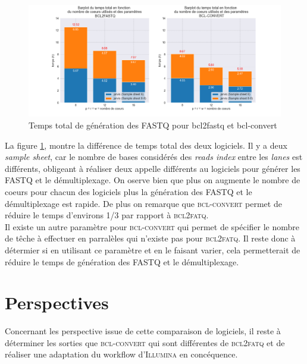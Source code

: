 \begin{figure}[H]
    \centering
    \includegraphics[width=1\textwidth]{img/barplot_total_time_comp.png}
    \caption{Temps total de génération des FASTQ pour bcl2fastq et bcl-convert}
    \label{fig-total-time}
\end{figure} 

La figure \ref{fig-total-time}, montre la différence de temps total des deux logiciels. Il y a deux \emph{sample sheet}, car le nombre de bases considérés des \emph{reads index} entre les \emph{lanes} est différents, obligeant à réaliser deux appelle différents au logiciels pour générer les \textsc{FASTQ} et le démultiplexage. 
On oserve bien que plus on augmente le nombre de coeurs pour chacun des logiciels plus la génération des \textsc{FASTQ} et le démultiplexage est rapide. De plus on remarque que \textsc{bcl-convert} permet de réduire le temps d'environs 1/3 par rapport à \textsc{bcl2fatq}.\\

Il existe un autre paramètre pour \textsc{bcl-convert} qui permet de spécifier le nombre de têche à effectuer en parralèles qui n'existe pas pour \textsc{bcl2fatq}. Il reste donc à détermier si en utilisant ce paramètre et en le faisant varier, cela permetterait de réduire le temps de génération des \textsc{FASTQ} et le démultiplexage. 
\section{Perspectives}
Concernant les perspective issue de cette comparaison de logiciels, il reste à déterminer les sorties que \textsc{bcl-convert} qui sont différentes de \textsc{bcl2fatq} et de réaliser une adaptation du workflow d'\textsc{Illumina} en concéquence. \\

